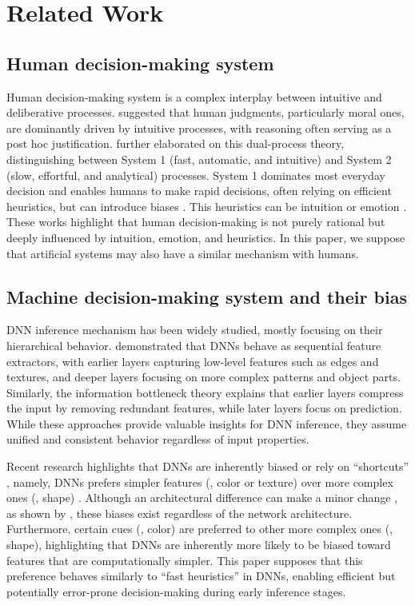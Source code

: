 \section{Related Work}
\subsection{Human decision-making system}

Human decision-making system is a complex interplay between intuitive and deliberative processes. \citet{haidt2001emotional} suggested that human judgments, particularly moral ones, are dominantly driven by intuitive processes, with reasoning often serving as a post hoc justification. \citet{kahneman2002maps} further elaborated on this dual-process theory, distinguishing between System 1 (fast, automatic, and intuitive) and System 2 (slow, effortful, and analytical) processes. System 1 dominates most everyday decision \citep{evans2008dual} and enables humans to make rapid decisions, often relying on efficient heuristics, but can introduce biases \citep{gigerenzer2011heuristic}. This heuristics can be intuition \citep{evans2008dual} or emotion \citep{slovic2007affect}.
These works highlight that human decision-making is not purely rational but deeply influenced by intuition, emotion, and heuristics.
In this paper, we suppose that artificial systems may also have a similar mechanism with humans.

\subsection{Machine decision-making system and their bias}

DNN inference mechanism has been widely studied, mostly focusing on their hierarchical behavior. \citet{zeiler2014visualizing} demonstrated that DNNs behave as sequential feature extractors, with earlier layers capturing low-level features such as edges and textures, and deeper layers focusing on more complex patterns and object parts. Similarly, the information bottleneck theory \citep{tishby2015deep,michael2018information_bottleneck} explains that earlier layers compress the input by removing redundant features, while later layers focus on prediction. While these approaches provide valuable insights for DNN inference, they assume unified and consistent behavior regardless of input properties.

Recent research highlights that DNNs are inherently biased or rely on ``shortcuts'' \citep{geirhos2020shortcut}, namely, DNNs prefers simpler features (\eg, color or texture) over more complex ones (\eg, shape) \citep{geirhos2018stylized_imagenet}.
Although an architectural difference can make a minor change \citep{brendel2019bagnet,bahng2019rebias,naseer2021intriguing}, as shown by \citet{scimeca2022shortcut}, these biases exist regardless of the network architecture. Furthermore, certain cues (\eg, color) are preferred to other more complex ones (\eg, shape), highlighting that DNNs are inherently more likely to be biased toward features that are computationally simpler.
This paper supposes that this preference behaves similarly to ``fast heuristics'' in DNNs, enabling efficient but potentially error-prone decision-making during early inference stages.